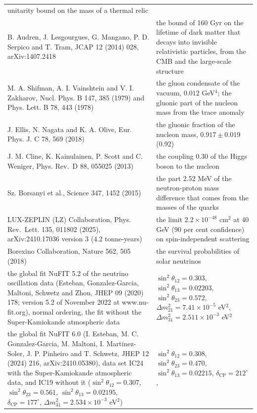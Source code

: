 \documentclass[
  10pt,
]{article}
\begin{document}
\begin{longtable}[]{@{}
  >{\raggedright\arraybackslash}p{}
  >{\raggedright\arraybackslash}p{}@{}}
unitarity bound on the mass of a thermal relic \\
B. Audren, J. Lesgourgues, G. Mangano, P. D. Serpico and T. Tram, JCAP
12 (2014) 028, arXiv:1407.2418 & the bound of 160 Gyr on the lifetime of
dark matter that decays into invisible relativistic particles, from the
CMB and the large-scale structure \\
M. A. Shifman, A. I. Vainshtein and V. I. Zakharov, Nucl. Phys. B 147,
385 (1979) and Phys. Lett. B 78, 443 (1978) & the gluon condensate of
the vacuum, \(0.012\) GeV\(^4\); the gluonic part of the nucleon mass
from the trace anomaly \\
J. Ellis, N. Nagata and K. A. Olive, Eur. Phys. J. C 78, 569 (2018) &
the gluonic fraction of the nucleon mass, \(0.917 \pm 0.019\) (0.92) \\
J. M. Cline, K. Kainulainen, P. Scott and C. Weniger, Phys. Rev.~D 88,
055025 (2013) & the coupling 0.30 of the Higgs boson to the nucleon \\
Sz. Borsanyi et al., Science 347, 1452 (2015) & the part 2.52 MeV of the
neutron-proton mass difference that comes from the masses of the
quarks \\
LUX-ZEPLIN (LZ) Collaboration, Phys. Rev.~Lett. 135, 011802 (2025),
arXiv:2410.17036 version 3 (4.2 tonne-years) & the limit
\(2.2\times10^{-48}\) cm\(^2\) at 40 GeV (90 per cent confidence) on
spin-independent scattering \\
Borexino Collaboration, Nature 562, 505 (2018) & the survival
probabilities of solar neutrinos \\
the global fit NuFIT 5.2 of the neutrino oscillation data (Esteban,
Gonzalez-Garcia, Maltoni, Schwetz and Zhou, JHEP 09 (2020) 178; version
5.2 of November 2022 at www.nu-fit.org), normal ordering, the fit
without the Super-Kamiokande atmospheric data &
\(\sin^2\theta_{12} = 0.303\), \(\sin^2\theta_{13} = 0.02203\),
\(\sin^2\theta_{23} = 0.572\), \(\Delta m^2_{21} = 7.41\times10^{-5}\)
eV\(^2\), \(\Delta m^2_{31} = 2.511\times10^{-3}\) eV\(^2\) \\
the global fit NuFIT 6.0 (I. Esteban, M. C. Gonzalez-Garcia, M. Maltoni,
I. Martinez-Soler, J. P. Pinheiro and T. Schwetz, JHEP 12 (2024) 216,
arXiv:2410.05380), data set IC24 with the Super-Kamiokande atmospheric
data, and IC19 without it (\(\sin^2\theta_{12} = 0.307\),
\(\sin^2\theta_{23} = 0.561\), \(\sin^2\theta_{13} = 0.02195\),
\(\delta_{\mathrm{CP}} = 177^\circ\),
\(\Delta m^2_{31} = 2.534\times10^{-3}\) eV\(^2\)) &
\(\sin^2\theta_{12} = 0.308\), \(\sin^2\theta_{23} = 0.470\),
\(\sin^2\theta_{13} = 0.02215\), \(\delta_{\mathrm{CP}} = 212^\circ\),

\end{longtable}
\end{document}
